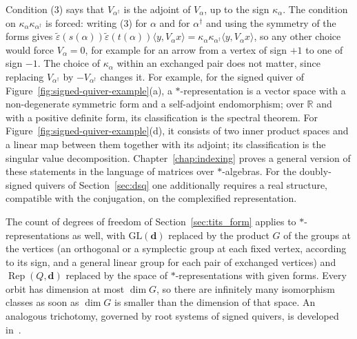 \documentclass[12pt, a4paper]{report}
\theoremstyle{plain}
\theoremstyle{definition}
\theoremstyle{remark}
\theoremstyle{plain}
\newcommand{\RR}{\mathbb{R}}
\newcommand{\GL}{\mathrm{GL}}
\DeclareMathOperator{\Rep}{Rep}
\begin{document}
Condition (3) says that $V_{\alpha^\dagger}$ is the adjoint of $V_\alpha$, up to the sign $\kappa_\alpha$. The condition on $\kappa_\alpha\kappa_{\alpha^\dagger}$ is forced: writing (3) for $\alpha$ and for $\alpha^\dagger$ and using the symmetry of the forms gives $\tilde\varepsilon(s(\alpha))\tilde\varepsilon(t(\alpha))\langle y,V_\alpha x\rangle=\kappa_\alpha\kappa_{\alpha^\dagger}\langle y,V_\alpha x\rangle$, so any other choice would force $V_\alpha=0$, for example for an arrow from a vertex of sign $+1$ to one of sign $-1$. The choice of $\kappa_\alpha$ within an exchanged pair does not matter, since replacing $V_{\alpha^\dagger}$ by $-V_{\alpha^\dagger}$ changes it. For example, for the signed quiver of Figure~\ref{fig:signed-quiver-example}(a), a $*$-representation is a vector space with a non-degenerate symmetric form and a self-adjoint endomorphism; over $\RR$ and with a positive definite form, its classification is the spectral theorem. For Figure~\ref{fig:signed-quiver-example}(d), it consists of two inner product spaces and a linear map between them together with its adjoint; its classification is the singular value decomposition. Chapter~\ref{chap:indexing} proves a general version of these statements in the language of matrices over $*$-algebras. For the doubly-signed quivers of Section~\ref{sec:dsq} one additionally requires a real structure, compatible with the conjugation, on the complexified representation.

The count of degrees of freedom of Section~\ref{sec:tits_form} applies to $*$-representations as well, with $\GL(\mathbf d)$ replaced by the product $G$ of the groups at the vertices (an orthogonal or a symplectic group at each fixed vertex, according to its sign, and a general linear group for each pair of exchanged vertices) and $\Rep(Q,\mathbf d)$ replaced by the space of $*$-representations with given forms. Every orbit has dimension at most $\dim G$, so there are infinitely many isomorphism classes as soon as $\dim G$ is smaller than the dimension of that space. An analogous trichotomy, governed by root systems of signed quivers, is developed in~\cite{Shmelkin2006,DerksenWeyman2002}.
\end{document}
